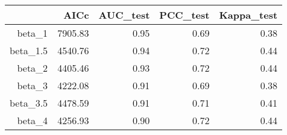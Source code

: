 \begin{table}[ht]
\centering
\begin{tabular}{rrrrr}
  \hline
 & AICc & AUC\_test & PCC\_test & Kappa\_test \\ 
  \hline
beta\_1 & 7905.83 & 0.95 & 0.69 & 0.38 \\ 
  beta\_1.5 & 4540.76 & 0.94 & 0.72 & 0.44 \\ 
  beta\_2 & 4405.46 & 0.93 & 0.72 & 0.44 \\ 
  beta\_3 & 4222.08 & 0.91 & 0.69 & 0.38 \\ 
  beta\_3.5 & 4478.59 & 0.91 & 0.71 & 0.41 \\ 
  beta\_4 & 4256.93 & 0.90 & 0.72 & 0.44 \\ 
   \hline
\end{tabular}
\end{table}

